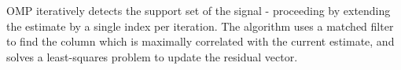 \documentclass{article}
\begin{document}
OMP iteratively detects the support set of the signal - proceeding by extending the estimate by a single index per iteration. The algorithm uses a matched filter to find the column which is maximally correlated with the current estimate, and solves a least-squares problem to update the residual vector.
\end{document}
